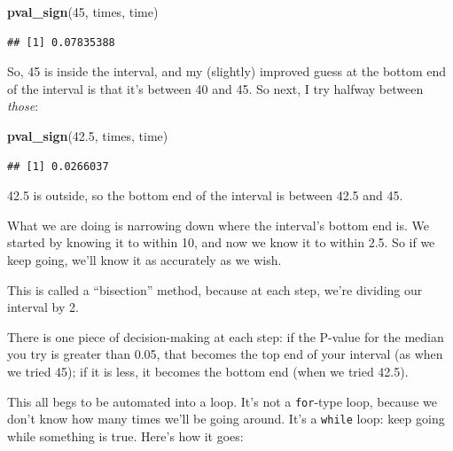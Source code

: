 \documentclass[]{tufte-book}
\newenvironment{Shaded}{}{}
\newcommand{\DecValTok}[1]{\textcolor[rgb]{0.25,0.63,0.44}{#1}}
\newcommand{\FloatTok}[1]{\textcolor[rgb]{0.25,0.63,0.44}{#1}}
\newcommand{\KeywordTok}[1]{\textcolor[rgb]{0.00,0.44,0.13}{\textbf{#1}}}
\newcommand{\NormalTok}[1]{#1}
\theoremstyle{definition}
\theoremstyle{definition}
\theoremstyle{definition}
\theoremstyle{remark}
\begin{document}
\begin{Shaded}
\begin{Highlighting}[]
\KeywordTok{pval_sign}\NormalTok{(}\DecValTok{45}\NormalTok{, times, time)}
\end{Highlighting}
\end{Shaded}

\begin{verbatim}
## [1] 0.07835388
\end{verbatim}

So, 45 is inside the interval, and my (slightly) improved guess at the
bottom end of the interval is that it's between 40 and 45. So next, I
try halfway between \emph{those}:

\begin{Shaded}
\begin{Highlighting}[]
\KeywordTok{pval_sign}\NormalTok{(}\FloatTok{42.5}\NormalTok{, times, time)}
\end{Highlighting}
\end{Shaded}

\begin{verbatim}
## [1] 0.0266037
\end{verbatim}

42.5 is outside, so the bottom end of the interval is between 42.5 and
45.

What we are doing is narrowing down where the interval's bottom end is.
We started by knowing it to within 10, and now we know it to within 2.5.
So if we keep going, we'll know it as accurately as we wish.

This is called a ``bisection'' method, because at each step, we're
dividing our interval by 2.

There is one piece of decision-making at each step: if the P-value for
the median you try is greater than 0.05, that becomes the top end of
your interval (as when we tried 45); if it is less, it becomes the
bottom end (when we tried 42.5).

This all begs to be automated into a loop. It's not a \texttt{for}-type
loop, because we don't know how many times we'll be going around. It's a
\texttt{while} loop: keep going while something is true. Here's how it
goes:
\end{document}
